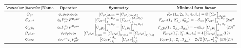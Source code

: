 \begin{table}[tbp]
\renewcommand{\arraystretch}{2.3}
\begin{align*}
\resizebox{\textwidth}{!}{
\begin{array}[t]{cccc}
\toprule
\rowcolor{hdrcolor}
\text{\textbf{Name}} & \text{\textbf{Operator}} &  \text{\textbf{Symmetry}} & \text{\textbf{Minimal form factor}} \\
\midrule
\mathcal{O}_{\phi^5} & \phi_a\phi_b\phi_c\phi_d\phi_e & [C_{\phi^5}]_{abcde}=[C_{\phi^5}]_{(abcde)} & F_{\phi^5}(1_{a},2_{b},3_{c},4_{d},5_{e}) = 5! \left[C_{\phi^5}\right]_{abcde}\\
\mathcal{O}_{\phi F^2} & \phi_{a}F^{A_\alpha}_{\mu\nu}F^{B_\beta  \mu\nu} & \left[C_{\phi F^2}\right]^{A_\alpha B_\beta}_{a}=\left[C_{\phi F^2}\right]^{(A_\alpha B_\beta)}_{a} &
F_{\phi F^2}(1_{a},2^-_{A_\alpha},3^-_{B_\beta}) = - \mathcal S_{\alpha\beta} \left[C_{\phi F^2}\right]^{A_\alpha B_\beta}_{a}\agl{2}{3}^2\\
%
\mathcal{O}_{\phi \tildee F^2} & \phi_{a}F^{A_\alpha}_{\mu\nu}\tildee F^{B_\beta  \mu\nu} & \left[C_{\phi \tildee F^2}\right]^{A_\alpha B_\beta}_{a}=\left[C_{\phi \tildee F^2}\right]^{(A_\alpha B_\beta)}_{a} 
 & F_{\phi \tildee F^2}(1_{a},2^-_{A_\alpha},3^-_{B_\beta})  = - i\mathcal S_{\alpha\beta} \left[C_{\phi \tildee F^2}\right]^{A_\alpha B_\beta}_{a}\agl{2}{3}^2\\ 
 \mathcal{O}_{\psi^2\phi^2} & \psi_i \psi_j \phi_a \phi_b  & \left[C_{\psi^2\phi^2}\right]_{ijab} = \left[C_{\psi^2\phi^2}\right]_{(ij)ab}  = \left[C_{\psi^2\phi^2}\right]_{ij(ab)} 
 & F_{\psi^2\phi^2}(1^-_{i},2^-_{j},3_a,4_b)  = 4 \left[C_{\psi^2\phi^2}\right]_{ijab}\agl{1}{2}\\
 \mathcal{O}_{\psi^2 F} &  \psi_i \sigma^{\mu\nu} \psi_j F_{\mu\nu}^{A_\alpha} & \left[C_{\psi^2 F}\right]_{ij}^{A_\alpha} = \left[C_{\psi^2 F}\right]_{[ij]}^{A_\alpha} 
 & F_{\psi^2 F}(1^-_{i},2^-_{j},3^-_{A_\alpha})  = 2\sqrt{2}\left[C_{\psi^2F}\right]_{ij}^{A_\alpha}\agl{1}{3}\agl{2}{3}\\
\bottomrule
%
\end{array}
}
\end{align*}
\caption{Dimension-five bosonic and fermionic operators of the general EFT, together with their minimal form factors and the symmetry properties of the associated Wilson coefficients.}
\label{tab:dim5gen}
\end{table}
